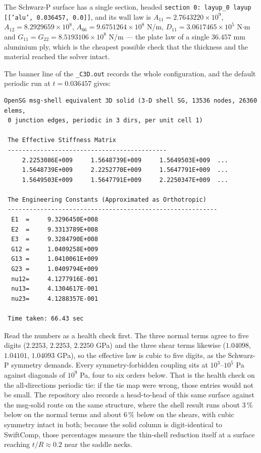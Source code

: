 \noindent
The Schwarz-P surface has a single section, headed
\texttt{section 0: layup\_0  layup [['alu', 0.036457, 0.0]]}, and its wall law
is $A_{11} = 2.7643220\times10^{9}$, $A_{12} = 8.2929659\times10^{8}$,
$A_{66} = 9.6751264\times10^{8}$ N/m, $D_{11} = 3.0617465\times10^{5}$
N$\cdot$m and $G_{11} = G_{22} = 8.5193106\times10^{8}$ N/m --- the plate law of
a single $36.457$ mm aluminium ply, which is the cheapest possible check that
the thickness and the material reached the solver intact.

The banner line of the \texttt{\_C3D.out} records the whole configuration, and
the default periodic run at $t = 0.036457$ gives:

\begin{Verbatim}[fontsize=\footnotesize,frame=single,framesep=4pt]
 OpenSG msg-shell equivalent 3D solid (3-D shell SG, 13536 nodes, 26360 elems,
 0 junction edges, periodic in 3 dirs, per unit cell 1)

 The Effective Stiffness Matrix
 --------------------------------------------
     2.2253086E+009     1.5648739E+009     1.5649503E+009  ...
     1.5648739E+009     2.2252770E+009     1.5647791E+009  ...
     1.5649503E+009     1.5647791E+009     2.2250347E+009  ...

 The Engineering Constants (Approximated as Orthotropic)
 ----------------------------------------------------------
  E1  =     9.3296450E+008
  E2  =     9.3313789E+008
  E3  =     9.3284790E+008
  G12 =     1.0409258E+009
  G13 =     1.0410061E+009
  G23 =     1.0409794E+009
  nu12=     4.1277916E-001
  nu13=     4.1304617E-001
  nu23=     4.1288357E-001

 Time taken: 66.43 sec
\end{Verbatim}

Read the numbers as a health check first. The three normal terms agree to five
digits ($2.2253$, $2.2253$, $2.2250$ GPa) and the three shear terms likewise
($1.04098$, $1.04101$, $1.04093$ GPa), so the effective law is cubic to five
digits, as the Schwarz-P symmetry demands. Every symmetry-forbidden coupling sits
at $10^{3}$--$10^{5}$ Pa against diagonals of $10^{9}$ Pa, four to six orders
below. That is the health check on the all-directions periodic tie: if the tie
map were wrong, those entries would not be small. The repository also records a
head-to-head of this same surface against the msg-solid route on the same
structure, where the shell result runs about 3\,\% below on the normal terms and
about 6\,\% below on the shears, with cubic symmetry intact in both; because the
solid column is digit-identical to SwiftComp, those percentages measure the
thin-shell reduction itself at a surface reaching $t/R \approx 0.2$ near the
saddle necks.

